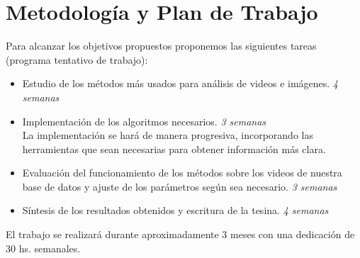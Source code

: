 \section{Metodología y Plan de Trabajo}
\iffalse
Se recomienda estructurar esta sección en función de los objetivos específicos.
* Planteo de la hipotesis a analizar en cada objetivo o seccion del proyecto.
* Actividades propuestas y metodologıa a usar en cada una de ellas.
* Resultados que se esperan obtener o metas a cumplir y como se evaluaran
los resultados.
Trate de evaluar los potenciales problemas y limitaciones de la metodolog ́ıa
y t ́ecnicas propuestas y en lo posible proponer alternativas.
\fi

Para alcanzar los objetivos propuestos proponemos las siguientes tareas (programa tentativo de trabajo):
\begin{itemize}
  \item Estudio de los métodos más usados para análisis de videos e imágenes. \textit{4 semanas}
  \item Implementación de los algoritmos necesarios. \textit{3 semanas}
    \\ La implementación se hará de manera progresiva, incorporando las herramientas que
    sean necesarias para obtener información más clara.
  \item Evaluación del funcionamiento de los métodos sobre los videos de nuestra base de datos y
  ajuste de los parámetros según sea necesario. \textit{3 semanas}
  \item Síntesis de los resultados obtenidos y escritura de la tesina. \textit{4 semanas}
\end{itemize}
El trabajo se realizará durante aproximadamente 3 meses con una dedicación de 30 hs. semanales.

